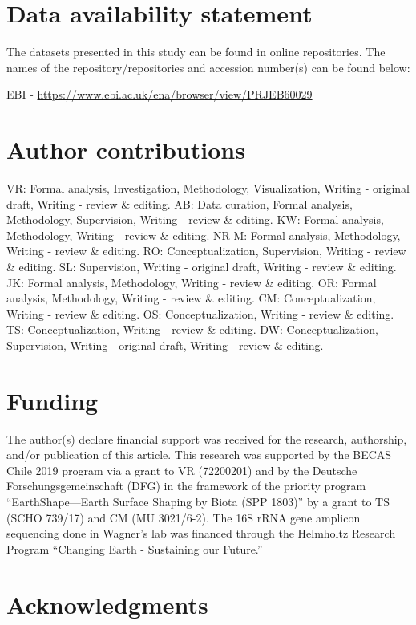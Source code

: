 \section*{Data availability statement}

The datasets presented in this study can be found in online repositories. The names of the repository/repositories and accession number(s) can be found below: 

EBI - \url{https://www.ebi.ac.uk/ena/browser/view/PRJEB60029}

\section*{Author contributions}

VR: Formal analysis, Investigation, Methodology, Visualization, Writing - original draft, Writing - review \& editing. AB: Data curation, Formal analysis, Methodology, Supervision, Writing - review \& editing. KW: Formal analysis, Methodology, Writing - review \& editing. NR-M: Formal analysis, Methodology, Writing - review \& editing. RO: Conceptualization, Supervision, Writing - review \& editing. SL: Supervision, Writing - original draft, Writing - review \& editing. JK: Formal analysis, Methodology, Writing - review \& editing. OR: Formal analysis, Methodology, Writing - review \& editing. CM: Conceptualization, Writing - review \& editing. OS: Conceptualization, Writing - review \& editing. TS: Conceptualization, Writing - review \& editing. DW: Conceptualization, Supervision, Writing - original draft, Writing - review \& editing.

\section*{Funding}

The author(s) declare financial support was received for the research, authorship, and/or publication of this article. This research was supported by the BECAS Chile 2019 program via a grant to VR (72200201) and by the Deutsche Forschungsgemeinschaft (DFG) in the framework of the priority program “EarthShape—Earth Surface Shaping by Biota (SPP 1803)” by a grant to TS (SCHO 739/17) and CM (MU 3021/6-2). The 16S rRNA gene amplicon sequencing done in Wagner's lab was financed through the Helmholtz Research Program “Changing Earth - Sustaining our Future.”

\section*{Acknowledgments}


